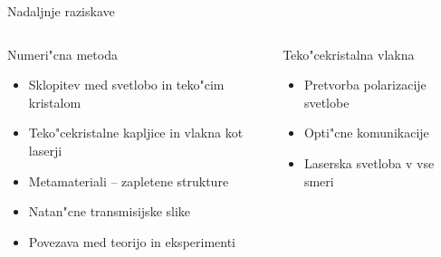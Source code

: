 \documentclass{beamer}
\begin{document}
\begin{frame}{Nadaljnje raziskave}
\begin{columns}

 
 \begin{block}{Numeri"cna metoda}
  \begin{itemize}
   \item Sklopitev med svetlobo in teko"cim kristalom
   \item Teko"cekristalne kapljice in vlakna kot laserji
   \item Metamateriali -- zapletene strukture
   \item Natan"cne transmisijske slike
   \item Povezava med teorijo in eksperimenti
  \end{itemize}
 \end{block}
 
 \begin{block}{Teko"cekristalna vlakna}
  \begin{itemize}
    \item Pretvorba polarizacije svetlobe
    \item Opti"cne komunikacije
    \item Laserska svetloba v vse smeri
  \end{itemize}
 \end{block}
 
 


\end{columns}
\end{frame}
\end{document}
